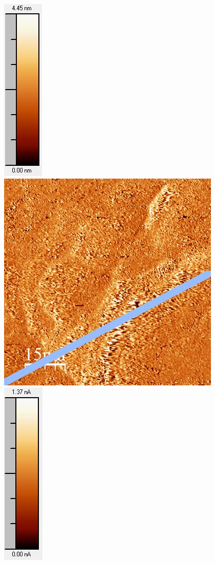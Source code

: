 \documentclass[12pt,a4paper]{article}
\begin{document}
\begin{figure}[H]
\includegraphics[scale=0.6]{Bilder/Anhang/Zeit/0_2_Zeit_nach_Skala.jpg}
\includegraphics[scale=0.6]{Bilder/Anhang/Zeit/Strom/0_2_Zeit_vor_Strom.jpg}
\includegraphics[scale=0.6]{Bilder/Anhang/Zeit/Strom/0_2_Zeit_vor_Strom_Skala.jpg}

\end{figure}
\end{document}
